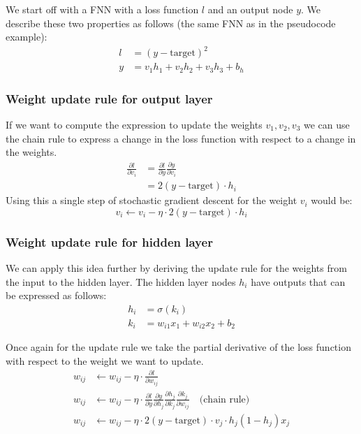 \documentclass[12pt]{article}
\begin{document}
We start off with a FNN with a loss function $l$ and an output node $y$. We describe these two properties as follows (the same FNN as in the pseudocode example):
\begin{align*}
    l & = (y - \text{target})^2 \\
    y & = v_1h_1 + v_2h_2 + v_3h_3 + b_h
\end{align*}

\subsubsection*{Weight update rule for output layer}

If we want to compute the expression to update the weights $v_1, v_2, v_3$ we can use the chain rule to express a change in the loss function with respect to a change in the weights.
\begin{align*}
    \frac{\partial l}{\partial v_i} & = \frac{\partial l}{\partial y}\frac{\partial y}{\partial v_i} \\
    & = 2(y - \text{target})\cdot h_i 
\end{align*}
Using this a single step of stochastic gradient descent for the weight $v_i$ would be:
\[
    v_i \leftarrow v_i - \eta\cdot 2(y - \text{target})\cdot h_i  
\]

\subsubsection*{Weight update rule for hidden layer}
We can apply this idea further by deriving the update rule for the weights from the input to the hidden layer. The hidden layer nodes $h_i$ have outputs that can be expressed as follows: 
\begin{align*}
    h_i & = \sigma(k_i) \\
    k_i & = w_{i1}x_1 + w_{i2}x_2 + b_2
\end{align*}

Once again for the update rule we take the partial derivative of the loss function with respect to the weight we want to update. 
\begin{align*}
    w_{ij} & \leftarrow w_{ij} - \eta\cdot \frac{\partial l}{\partial w_{ij}} \\
    w_{ij} & \leftarrow w_{ij} - \eta\cdot \frac{\partial l}{\partial y}\frac{\partial y}{\partial h_j}\frac{\partial h_j}{\partial k_j}\frac{\partial k_j}{\partial w_{ij}} \quad \text{(chain rule)}\\
    w_{ij} & \leftarrow w_{ij} - \eta\cdot 2(y - \text{target})\cdot v_j\cdot h_j(1-h_j)x_j
\end{align*}
\end{document}
